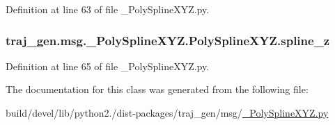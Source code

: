 Definition at line 63 of file \+\_\+\+Poly\+Spline\+X\+Y\+Z.\+py.

\subsubsection[{\texorpdfstring{spline\+\_\+z}{spline_z}}]{\setlength{\rightskip}{0pt plus 5cm}traj\+\_\+gen.\+msg.\+\_\+\+Poly\+Spline\+X\+Y\+Z.\+Poly\+Spline\+X\+Y\+Z.\+spline\+\_\+z}\hypertarget{classtraj__gen_1_1msg_1_1___poly_spline_x_y_z_1_1_poly_spline_x_y_z_a4e4226ec1ac7dea49a81a5ae4b98db1b}{}\label{classtraj__gen_1_1msg_1_1___poly_spline_x_y_z_1_1_poly_spline_x_y_z_a4e4226ec1ac7dea49a81a5ae4b98db1b}


Definition at line 65 of file \+\_\+\+Poly\+Spline\+X\+Y\+Z.\+py.



The documentation for this class was generated from the following file\+:\begin{DoxyCompactItemize}
\item 
build/devel/lib/python2./dist-\/packages/traj\+\_\+gen/msg/\hyperlink{___poly_spline_x_y_z_8py}{\+\_\+\+Poly\+Spline\+X\+Y\+Z.\+py}\end{DoxyCompactItemize}
